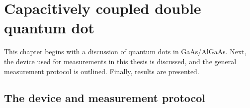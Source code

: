 
\chapter{Capacitively coupled double quantum dot}
\label{ch:Methods}

This chapter begins with a discussion of quantum dots in GaAs/AlGaAs. Next, the device used for measurements in this thesis is discussed, and the general measurement protocol is outlined. Finally, results are presented. 



\section{The device and measurement protocol}
\label{sec:device}


